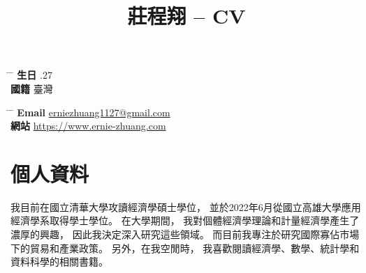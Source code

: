 \documentclass[utf8, 12pt]{article} %
\begin{document}
\fontsize{12}{20pt}\selectfont %


\title{莊程翔 -- CV} %


\parbox{0.5\textwidth}{ %
\begin{tabbing}
\hspace{2cm} \= \hspace{4cm} \= \kill %
{\bf 生日} .27 \\ %
{\bf 國籍} \> 臺灣 %
\end{tabbing}}
%
\hfill %
%
\parbox{0.5\textwidth}{ %
\begin{tabbing}
\hspace{2cm} \= \hspace{4cm} \= \kill %
{\bf Email} \> \href{mailto:john@smith.com}{erniezhuang1127@gmail.com} \\ %
{\bf 網站} \> \href{https://www.ernie-zhuang.com}{https://www.ernie-zhuang.com} %
\end{tabbing}}


\section{個人資料}

我目前在國立清華大學攻讀經濟學碩士學位，
並於2022年6月從國立高雄大學應用經濟學系取得學士學位。
在大學期間，
我對個體經濟學理論和計量經濟學產生了濃厚的興趣，
因此我決定深入研究這些領域。
而目前我專注於研究國際寡佔市場下的貿易和產業政策。
另外，在我空閒時，
我喜歡閱讀經濟學、數學、統計學和資料科學的相關書籍。\\
\end{document}
